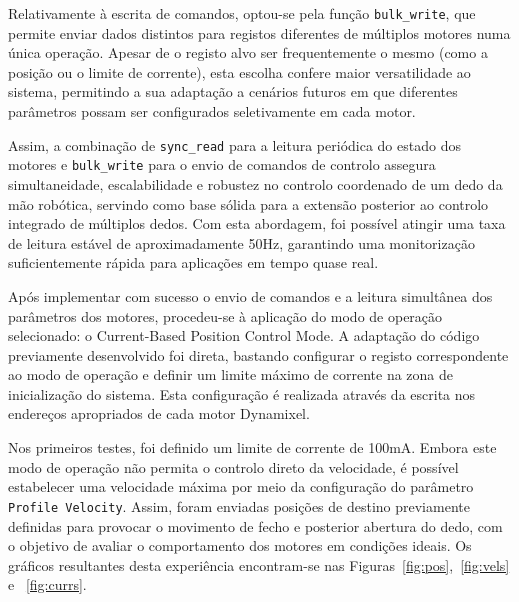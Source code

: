 Relativamente à escrita de comandos, optou-se pela função \texttt{bulk\_write}, que permite enviar dados distintos para registos diferentes de múltiplos motores numa única operação. Apesar de o registo alvo ser frequentemente o mesmo (como a posição ou o limite de corrente), esta escolha confere maior versatilidade ao sistema, permitindo a sua adaptação a cenários futuros em que diferentes parâmetros possam ser configurados seletivamente em cada motor.

Assim, a combinação de \texttt{sync\_read} para a leitura periódica do estado dos motores e \texttt{bulk\_write} para o envio de comandos de controlo assegura simultaneidade, escalabilidade e robustez no controlo coordenado de um dedo da mão robótica, servindo como base sólida para a extensão posterior ao controlo integrado de múltiplos dedos. Com esta abordagem, foi possível atingir uma taxa de leitura estável de aproximadamente 50Hz, garantindo uma monitorização suficientemente rápida para aplicações em tempo quase real.

Após implementar com sucesso o envio de comandos e a leitura simultânea dos parâmetros dos motores, procedeu-se à aplicação do modo de operação selecionado: o Current-Based Position Control Mode. A adaptação do código previamente desenvolvido foi direta, bastando configurar o registo correspondente ao modo de operação e definir um limite máximo de corrente na zona de inicialização do sistema. Esta configuração é realizada através da escrita nos endereços apropriados de cada motor Dynamixel.

Nos primeiros testes, foi definido um limite de corrente de 100mA. Embora este modo de operação não permita o controlo direto da velocidade, é possível estabelecer uma velocidade máxima por meio da configuração do parâmetro \texttt{Profile Velocity}. Assim, foram enviadas posições de destino previamente definidas para provocar o movimento de fecho e posterior abertura do dedo, com o objetivo de avaliar o comportamento dos motores em condições ideais. Os gráficos resultantes desta experiência encontram-se nas Figuras~\ref{fig:pos},~\ref{fig:vels} e ~\ref{fig:currs}.

